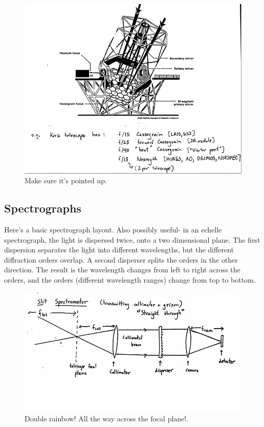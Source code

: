\begin{figure}[!h]
\begin{center}
\includegraphics[width=\textwidth]{telescope.jpg}
\end{center}
\caption{Make sure it's pointed up.
\label{fig:telescope}}
\end{figure}

\subsection{Spectrographs}
Here's a basic spectrograph layout.  Also possibly useful- in an echelle 
spectrograph, the light is dispersed twice, onto a two dimensional plane.  
The first dispersion separates the light into different wavelengths, but 
the different diffraction orders overlap.  A second disperser splits the 
orders in the other direction.  The result is the wavelength changes from 
left to right across the orders, and the orders (different wavelength ranges) 
change from top to bottom.  

\begin{figure}[!h]
\begin{center}
\includegraphics[width=\textwidth]{spectrograph.jpg}
\end{center}
\caption{Double rainbow!  All the way across the focal plane!.
\label{fig:spectrograph}}
\end{figure}


